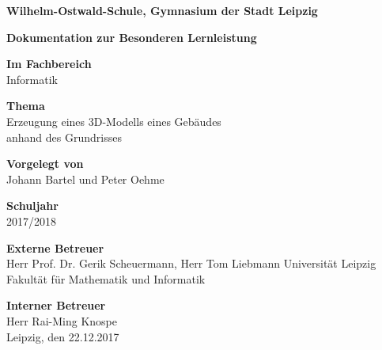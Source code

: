 \begin{center}
	\thispagestyle{empty}
			\textbf{Wilhelm-Ostwald-Schule, Gymnasium der Stadt Leipzig}
			
			\Large
			\textbf{Dokumentation zur Besonderen Lernleistung} \break
			
			\large
			\textbf{Im Fachbereich}\\
			Informatik \break
			
			
			\textbf{Thema}\\
			Erzeugung eines 3D-Modells eines Gebäudes\\ anhand des Grundrisses \break
			
			\textbf{Vorgelegt von}\\
			Johann Bartel und Peter Oehme \break
			
			\textbf{Schuljahr}\\
			2017/2018 \break
			
			\textbf{Externe Betreuer}\\
			Herr Prof. Dr. Gerik Scheuermann, Herr Tom Liebmann \break
			Universität Leipzig
			Fakultät für Mathematik und Informatik \break
			
			\textbf{Interner Betreuer}\\
			Herr Rai-Ming Knospe\\
			Leipzig, den 22.12.2017
			
	 
			
\end{center}